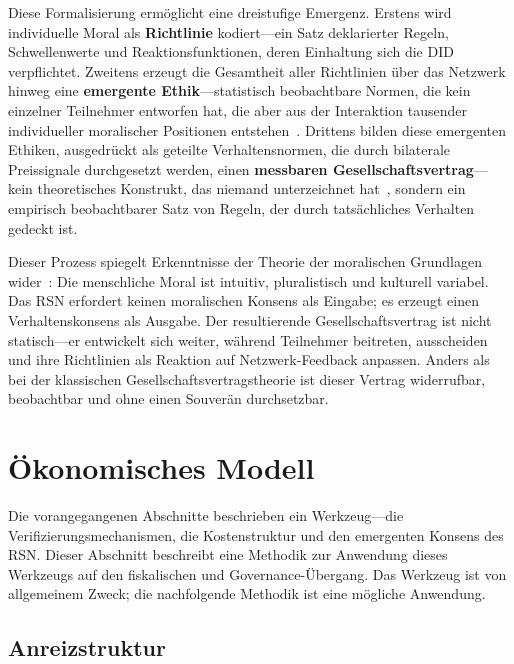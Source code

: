 \documentclass[11pt,a4paper,twocolumn]{article}
\begin{document}
Diese Formalisierung ermöglicht eine dreistufige Emergenz. Erstens wird individuelle Moral als \textbf{Richtlinie} kodiert---ein Satz deklarierter Regeln, Schwellenwerte und Reaktionsfunktionen, deren Einhaltung sich die DID verpflichtet. Zweitens erzeugt die Gesamtheit aller Richtlinien über das Netzwerk hinweg eine \textbf{emergente Ethik}---statistisch beobachtbare Normen, die kein einzelner Teilnehmer entworfen hat, die aber aus der Interaktion tausender individueller moralischer Positionen entstehen~\cite{durkheim1893}. Drittens bilden diese emergenten Ethiken, ausgedrückt als geteilte Verhaltensnormen, die durch bilaterale Preissignale durchgesetzt werden, einen \textbf{messbaren Gesellschaftsvertrag}---kein theoretisches Konstrukt, das niemand unterzeichnet hat~\cite{rawls1971}, sondern ein empirisch beobachtbarer Satz von Regeln, der durch tatsächliches Verhalten gedeckt ist.

Dieser Prozess spiegelt Erkenntnisse der Theorie der moralischen Grundlagen wider~\cite{haidt2012}: Die menschliche Moral ist intuitiv, pluralistisch und kulturell variabel. Das RSN erfordert keinen moralischen Konsens als Eingabe; es erzeugt einen Verhaltenskonsens als Ausgabe. Der resultierende Gesellschaftsvertrag ist nicht statisch---er entwickelt sich weiter, während Teilnehmer beitreten, ausscheiden und ihre Richtlinien als Reaktion auf Netzwerk-Feedback anpassen. Anders als bei der klassischen Gesellschaftsvertragstheorie ist dieser Vertrag widerrufbar, beobachtbar und ohne einen Souverän durchsetzbar.

\section{Ökonomisches Modell}

Die vorangegangenen Abschnitte beschrieben ein Werkzeug---die Verifizierungsmechanismen, die Kostenstruktur und den emergenten Konsens des RSN. Dieser Abschnitt beschreibt eine Methodik zur Anwendung dieses Werkzeugs auf den fiskalischen und Governance-Übergang. Das Werkzeug ist von allgemeinem Zweck; die nachfolgende Methodik ist eine mögliche Anwendung.

\subsection{Anreizstruktur}
\end{document}
